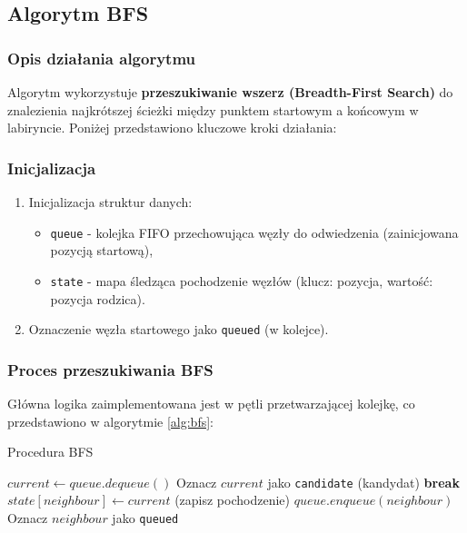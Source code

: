 \documentclass[../../../../doc.tex]{subfiles}
\begin{document}
\subsection{Algorytm BFS}

\subsubsection{Opis działania algorytmu}

Algorytm wykorzystuje \textbf{przeszukiwanie wszerz (Breadth-First Search)} do znalezienia najkrótszej ścieżki między punktem startowym a końcowym w labiryncie. Poniżej przedstawiono kluczowe kroki działania:

\subsubsection{Inicjalizacja}
\begin{enumerate}
  \item Inicjalizacja struktur danych:
        \begin{itemize}
          \item \texttt{queue} - kolejka FIFO przechowująca węzły do odwiedzenia (zainicjowana pozycją startową),
          \item \texttt{state} - mapa śledząca pochodzenie węzłów (klucz: pozycja, wartość: pozycja rodzica).
        \end{itemize}
  \item Oznaczenie węzła startowego jako \texttt{queued} (w kolejce).
\end{enumerate}

\subsubsection{Proces przeszukiwania BFS}
Główna logika zaimplementowana jest w pętli przetwarzającej kolejkę, co przedstawiono w algorytmie \ref{alg:bfs}:

\begin{algorithm}
  \caption{Procedura BFS}
  \begin{algorithmic}
    \STATE $current \gets queue.dequeue()$
    \STATE Oznacz $current$ jako \texttt{candidate} (kandydat)
    \STATE \textbf{break}
    \ENDIF
    \STATE $state[neighbour] \gets current$ (zapisz pochodzenie)
    \STATE $queue.enqueue(neighbour)$
    \STATE Oznacz $neighbour$ jako \texttt{queued}
    \ENDIF
    \ENDFOR
    \ENDWHILE
  \end{algorithmic}
  \label{alg:bfs}
\end{algorithm}
\end{document}
